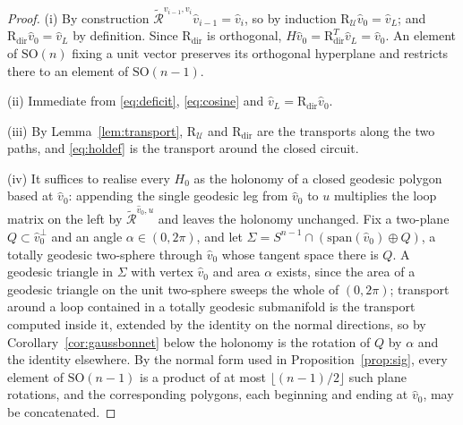 \documentclass[10pt,a4paper]{amsart}
\newcommand{\Rmin}{\widetilde{\mathcal{R}}}
\newcommand{\SO}{\mathrm{SO}}
\newcommand{\Uc}{\mathcal{U}}
\begin{document}
\begin{proof}
(i) By construction $\Rmin^{v_{i-1},v_i}\hat{v}_{i-1} = \hat{v}_i$, so
by induction $\mathrm{R}_\Uc \hat{v}_0 = \hat{v}_L$; and
$\mathrm{R}_{\mathrm{dir}}\hat{v}_0 = \hat{v}_L$ by definition. Since
$\mathrm{R}_{\mathrm{dir}}$ is orthogonal,
$H\hat{v}_0 = \mathrm{R}_{\mathrm{dir}}^{T}\hat{v}_L = \hat{v}_0$. An
element of $\SO(n)$ fixing a unit vector preserves its orthogonal
hyperplane and restricts there to an element of $\SO(n-1)$.

(ii) Immediate from \eqref{eq:deficit}, \eqref{eq:cosine} and
$\hat{v}_L = \mathrm{R}_{\mathrm{dir}}\hat{v}_0$.

(iii) By Lemma~\ref{lem:transport}, $\mathrm{R}_\Uc$ and
$\mathrm{R}_{\mathrm{dir}}$ are the transports along the two paths, and
\eqref{eq:holdef} is the transport around the closed circuit.

(iv) It suffices to realise every $H_0$ as the holonomy of a closed
geodesic polygon based at $\hat{v}_0$: appending the single geodesic leg
from $\hat{v}_0$ to $u$ multiplies the loop matrix on the left by
$\Rmin^{\hat{v}_0,u}$ and leaves the holonomy unchanged. Fix a two-plane
$Q \subset \hat{v}_0^{\perp}$ and an angle $\alpha \in (0,2\pi)$, and let
$\Sigma = S^{n-1}\cap(\mathrm{span}(\hat{v}_0)\oplus Q)$, a totally
geodesic two-sphere through $\hat{v}_0$ whose tangent space there is
$Q$. A geodesic triangle in $\Sigma$ with vertex $\hat{v}_0$ and area
$\alpha$ exists, since the area of a geodesic triangle on the unit
two-sphere sweeps the whole of $(0,2\pi)$; transport around a loop
contained in a totally geodesic submanifold is the transport computed
inside it, extended by the identity on the normal directions, so by
Corollary~\ref{cor:gaussbonnet} below the holonomy is the rotation of
$Q$ by $\alpha$ and the identity elsewhere. By the normal form used in
Proposition~\ref{prop:sig}, every element of $\SO(n-1)$ is a product of
at most $\lfloor (n-1)/2 \rfloor$ such plane rotations, and the
corresponding polygons, each beginning and ending at $\hat{v}_0$, may be
concatenated.
\end{proof}
\end{document}
